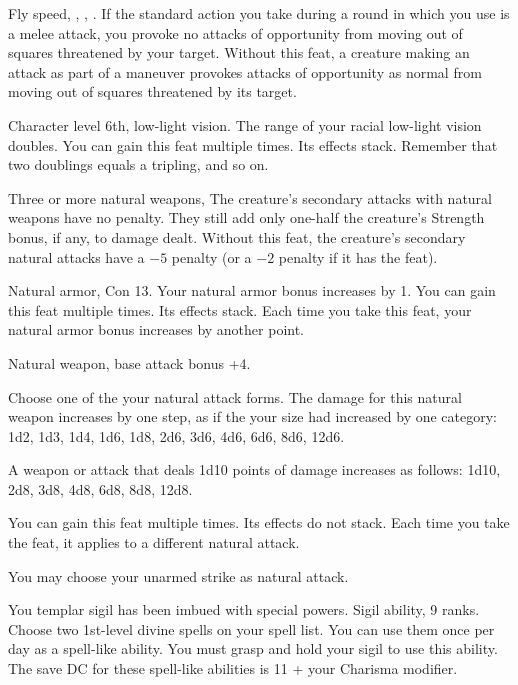 {}
{Fly speed, , , .}
{If the standard action you take during a round in which you use  is a melee attack, you provoke no attacks of opportunity from moving out of squares threatened by your target.}
{Without this feat, a creature making an attack as part of a  maneuver provokes attacks of opportunity as normal from moving out of squares threatened by its target.}
{}

{}{Character level 6th, low-light vision.}
{The range of your racial low-light vision doubles.}
{}{You can gain this feat multiple times. Its effects stack. Remember that two doublings equals a tripling, and so on.}

{}
{Three or more natural weapons, }
{The creature's secondary attacks with natural weapons have no penalty. They still add only one-half the creature's Strength bonus, if any, to damage dealt.}
{Without this feat, the creature's secondary natural attacks have a $-5$ penalty (or a $-2$ penalty if it has the  feat).}
{}

{}
{Natural armor, Con 13.}
{Your natural armor bonus increases by 1.}
{}
{You can gain this feat multiple times. Its effects stack. Each time you take this feat, your natural armor bonus increases by another point.}

{}
{Natural weapon, base attack bonus +4.}
{Choose one of the your natural attack forms. The damage for this natural weapon increases by one step, as if the your size had increased by one category: 1d2, 1d3, 1d4, 1d6, 1d8, 2d6, 3d6, 4d6, 6d6, 8d6, 12d6.

A weapon or attack that deals 1d10 points of damage increases as follows: 1d10, 2d8, 3d8, 4d8, 6d8, 8d8, 12d8.}
{}
{You can gain this feat multiple times. Its effects do not stack. Each time you take the feat, it applies to a different natural attack.

You may choose your unarmed strike as natural attack.}

{You templar sigil has been imbued with special powers.}
{Sigil ability,  9 ranks.}
{Choose two 1st-level divine spells on your spell list. You can use them once per day as a spell-like ability. You must grasp and hold your sigil to use this ability. The save DC for these spell-like abilities is 11 + your Charisma modifier.}{}{}

